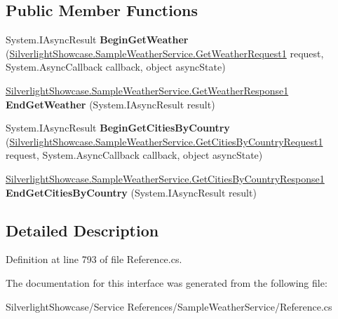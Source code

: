 \subsection*{Public Member Functions}
\begin{DoxyCompactItemize}
\item 
\hypertarget{interface_silverlight_showcase_1_1_sample_weather_service_1_1_global_weather_http_post_a416e459a467662e33c77afc517ea1c66}{
System.IAsyncResult {\bfseries BeginGetWeather} (\hyperlink{class_silverlight_showcase_1_1_sample_weather_service_1_1_get_weather_request1}{SilverlightShowcase.SampleWeatherService.GetWeatherRequest1} request, System.AsyncCallback callback, object asyncState)}
\label{interface_silverlight_showcase_1_1_sample_weather_service_1_1_global_weather_http_post_a416e459a467662e33c77afc517ea1c66}

\item 
\hypertarget{interface_silverlight_showcase_1_1_sample_weather_service_1_1_global_weather_http_post_a45a8e43d6224ed63ba27332454914acd}{
\hyperlink{class_silverlight_showcase_1_1_sample_weather_service_1_1_get_weather_response1}{SilverlightShowcase.SampleWeatherService.GetWeatherResponse1} {\bfseries EndGetWeather} (System.IAsyncResult result)}
\label{interface_silverlight_showcase_1_1_sample_weather_service_1_1_global_weather_http_post_a45a8e43d6224ed63ba27332454914acd}

\item 
\hypertarget{interface_silverlight_showcase_1_1_sample_weather_service_1_1_global_weather_http_post_a6ce45b4af5e1c97ce42c4b0b251ffb46}{
System.IAsyncResult {\bfseries BeginGetCitiesByCountry} (\hyperlink{class_silverlight_showcase_1_1_sample_weather_service_1_1_get_cities_by_country_request1}{SilverlightShowcase.SampleWeatherService.GetCitiesByCountryRequest1} request, System.AsyncCallback callback, object asyncState)}
\label{interface_silverlight_showcase_1_1_sample_weather_service_1_1_global_weather_http_post_a6ce45b4af5e1c97ce42c4b0b251ffb46}

\item 
\hypertarget{interface_silverlight_showcase_1_1_sample_weather_service_1_1_global_weather_http_post_afebabda008c6a27ef72be8549de8fc50}{
\hyperlink{class_silverlight_showcase_1_1_sample_weather_service_1_1_get_cities_by_country_response1}{SilverlightShowcase.SampleWeatherService.GetCitiesByCountryResponse1} {\bfseries EndGetCitiesByCountry} (System.IAsyncResult result)}
\label{interface_silverlight_showcase_1_1_sample_weather_service_1_1_global_weather_http_post_afebabda008c6a27ef72be8549de8fc50}

\end{DoxyCompactItemize}


\subsection{Detailed Description}


Definition at line 793 of file Reference.cs.

The documentation for this interface was generated from the following file:\begin{DoxyCompactItemize}
\item 
SilverlightShowcase/Service References/SampleWeatherService/Reference.cs\end{DoxyCompactItemize}
